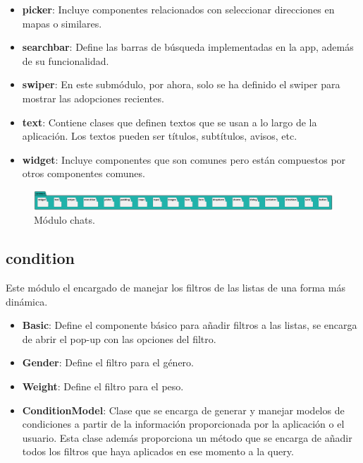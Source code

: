 \documentclass[a4paper, 12pt]{article}
\begin{document}
\begin{itemize}[noitemsep]
	\item \textbf{picker}: Incluye componentes relacionados con seleccionar direcciones en mapas o similares.
	\item \textbf{searchbar}: Define las barras de búsqueda implementadas en la app, además de su funcionalidad.
	\item \textbf{swiper}: En este submódulo, por ahora, solo se ha definido el swiper para mostrar las adopciones recientes.
	\item \textbf{text}: Contiene clases que definen textos que se usan a lo largo de la aplicación. Los textos pueden ser títulos, subtítulos, avisos, etc.
	\item \textbf{widget}: Incluye componentes que son comunes pero están compuestos por otros componentes comunes.
\end{itemize}


\begin{figure}[H]
	\begin{center}
		{\includegraphics[width=0.8\linewidth]{diagram/Common.png}\par}
		\caption{Módulo chats.}
	\end{center}
\end{figure}

\subsection*{condition}

Este módulo el encargado de manejar los filtros de las listas de una forma más dinámica. 

\begin{itemize}[noitemsep]
	\item \textbf{Basic}: Define el componente básico para añadir filtros a las listas, se encarga de abrir el pop-up con las opciones del filtro.
	\item \textbf{Gender}: Define el filtro para el género.
	\item \textbf{Weight}: Define el filtro para el peso.
	\item \textbf{ConditionModel}: Clase que se encarga de generar y manejar modelos de condiciones a partir de la información proporcionada por la aplicación o el usuario. Esta clase además proporciona un método que se encarga de añadir todos los filtros que haya aplicados en ese momento a la query.
\end{itemize}
\end{document}
